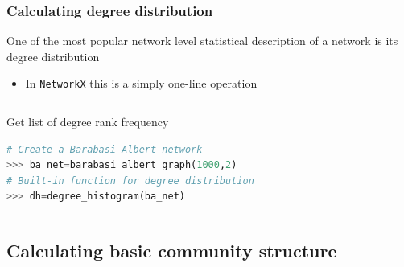 \documentclass[xcolor=dvipsnames, 9pt]{beamer}
\begin{document}
\begin{frame}[fragile]
    \frametitle{Calculating degree distribution}
    One of the most popular network level statistical description of a network is its degree distribution
    \begin{itemize}
        \item In \texttt{NetworkX} this is a simply one-line operation
    \end{itemize}
    \begin{columns}
         \begin{block}{Get list of degree rank frequency}
                \scriptsize{\begin{lstlisting}[language=Python]
# Create a Barabasi-Albert network
>>> ba_net=barabasi_albert_graph(1000,2)   
# Built-in function for degree distribution
>>> dh=degree_histogram(ba_net)
                \end{lstlisting}}
         \end{block}
    \end{columns}
\end{frame}



\subsection{Calculating basic community structure} %
\label{sub:calculating_basic_community_structure}
\end{document}
